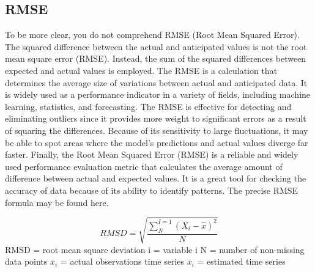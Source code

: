 \documentclass[a4paper,fleqn]{cas-sc}
\begin{document}
\subsection{ RMSE}
To be more clear, you do not comprehend RMSE (Root Mean Squared Error). The squared difference between the actual and anticipated values is not the root mean square error (RMSE). Instead, the sum of the squared differences between expected and actual values is employed. The RMSE is a calculation that determines the average size of variations between actual and anticipated data. It is widely used as a performance indicator in a variety of fields, including machine learning, statistics, and forecasting. The RMSE is effective for detecting and eliminating outliers since it provides more weight to significant errors as a result of squaring the differences. 
Because of its sensitivity to large fluctuations, it may be able to spot areas where the model's predictions and actual values diverge far faster. Finally, the Root Mean Squared Error (RMSE) is a reliable and widely used performance evaluation metric that calculates the average amount of difference between actual and expected values. It is a great tool for checking the accuracy of data because of its ability to identify patterns. The precise RMSE formula may be found here.\cite{abuella2015solar}

\begin{equation}
RMSD = \sqrt{\frac{\sum_{N}^{I=1}(X_i-\hat{x})^{2}}{N}}
\end{equation}
RMSD = root mean square deviation 
i = variable i 
N = number of non-missing data points
${x_i}$ = actual observations time series 
${x_i}$ = estimated time series 
 
\end{document}
